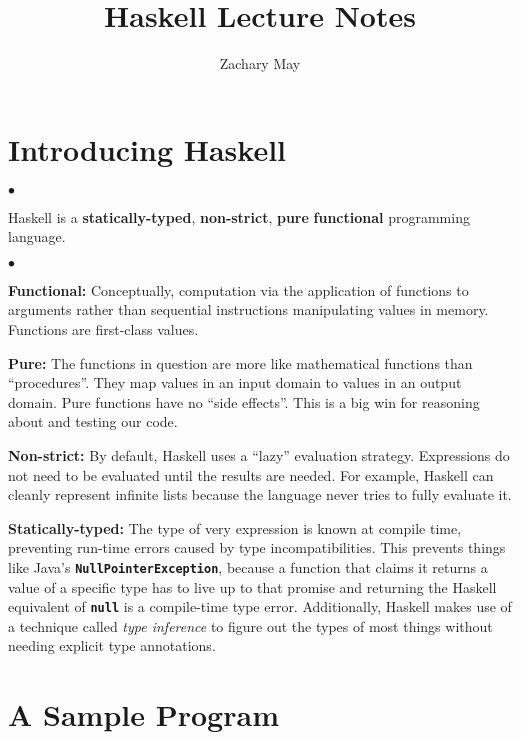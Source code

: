 \documentclass[12pt]{article}
\author{Zachary May}
\title{Haskell Lecture Notes}
\newcommand\note[1]{\raggedright\fbox{#1}}
\newcommand\codebold[1]{\texttt{\textbf{#1}}}
\newenvironment{notelist}{\begin{list}
   {$\bullet$}
   {\setlength{\itemsep}{0in}}}
   {\end{list}}
\begin{document}
\maketitle

\section{Introducing Haskell}
\begin{notelist}
\item Haskell is a \textbf{statically-typed}, \textbf{non-strict}, \textbf{pure} \textbf{functional}
      programming language.
	\begin{notelist}
	\item \textbf{Functional:} Conceptually, computation via the application of functions to arguments rather than sequential instructions
          manipulating values in memory. Functions are first-class values.
	\item \textbf{Pure:} The functions in question are more like mathematical functions than ``procedures''. They map values in an input domain
          to values in an output domain. Pure functions have no ``side effects''. This is a big win for reasoning about and testing our code.
	\item \textbf{Non-strict:} By default, Haskell uses a ``lazy'' evaluation strategy. Expressions do not need to be evaluated until the 
          results are needed. For example, Haskell can cleanly represent infinite lists because the language never tries to fully evaluate it.
    \item \textbf{Statically-typed:} The type of very expression is known at compile time, preventing run-time errors caused by type
          incompatibilities. This prevents things like Java's \codebold{NullPointerException}, because a function that claims it returns
          a value of a specific type has to live up to that promise and returning the Haskell equivalent of \codebold{null} is a compile-time
          type error. Additionally, Haskell makes use of a technique called \textit{type inference} to figure out the types of most things
          without needing explicit type annotations.
	\end{notelist}
\end{notelist}
\pagebreak

\section{A Sample Program}
\end{document}
